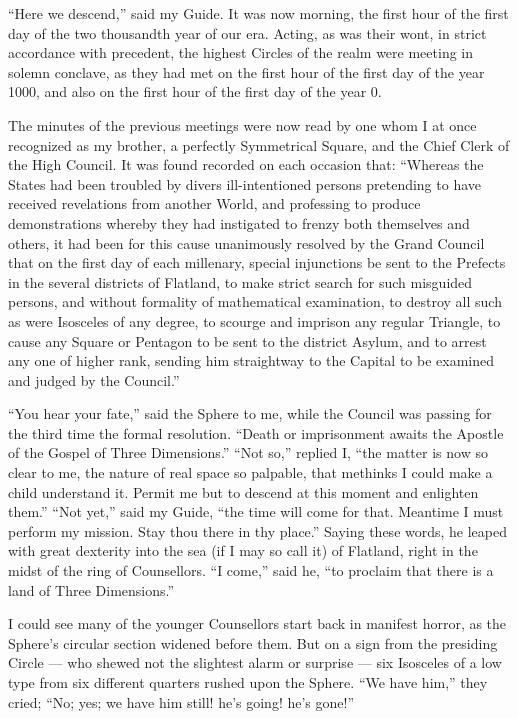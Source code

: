 \documentclass[12pt, a4paper, twoside]{memoir}
\begin{document}
``Here we descend,'' said my Guide. It was now morning, the first hour of the
first day of the two thousandth year of our era. Acting, as was their wont, in
strict accordance with precedent, the highest Circles of the realm were
meeting in solemn conclave, as they had met on the first hour of the first day
of the year 1000, and also on the first hour of the first day of the year 0.

The minutes of the previous meetings were now read by one whom I at once
recognized as my brother, a perfectly Symmetrical Square, and the Chief Clerk
of the High Council. It was found recorded on each occasion that: ``Whereas the
States had been troubled by divers ill-intentioned persons pretending to have
received revelations from another World, and professing to produce
demonstrations whereby they had instigated to frenzy both themselves and
others, it had been for this cause unanimously resolved by the Grand Council
that on the first day of each millenary, special injunctions be sent to the
Prefects in the several districts of Flatland, to make strict search for such
misguided persons, and without formality of mathematical examination, to
destroy all such as were Isosceles of any degree, to scourge and imprison any
regular Triangle, to cause any Square or Pentagon to be sent to the district
Asylum, and to arrest any one of higher rank, sending him straightway to the
Capital to be examined and judged by the Council.''

``You hear your fate,'' said the Sphere to me, while the Council was passing for
the third time the formal resolution. ``Death or imprisonment awaits the
Apostle of the Gospel of Three Dimensions.'' ``Not so,'' replied I, ``the matter
is now so clear to me, the nature of real space so palpable, that methinks I
could make a child understand it. Permit me but to descend at this moment and
enlighten them.'' ``Not yet,'' said my Guide, ``the time will come for that.
Meantime I must perform my mission. Stay thou there in thy place.'' Saying
these words, he leaped with great dexterity into the sea (if I may so call it)
of Flatland, right in the midst of the ring of Counsellors. ``I come,'' said he,
``to proclaim that there is a land of Three Dimensions.''

I could see many of the younger Counsellors start back in manifest horror, as
the Sphere's circular section widened before them. But on a sign from the
presiding Circle --- who shewed not the slightest alarm or surprise --- six
Isosceles of a low type from six different quarters rushed upon the Sphere.
``We have him,'' they cried; ``No; yes; we have him still! he's going! he's
gone!''
\end{document}
